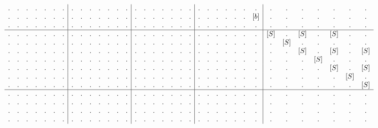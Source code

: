 \begin{example}
\begin{align}
\begin{array}{c c c c c c c | c c c c c c c | c c c c c c c | c c c c c c c | c c c c c c c}
. & . & . & . & . & . & .  &  . & . & . & . & . & . & .  &  . & . & . & . & . & . & .  &  . & . & .   & . & .   & . & .    &  . & . & . & . & . & . & .   \\
. & . & . & . & . & . & .  &  . & . & . & . & . & . & .  &  . & . & . & . & . & . & .  &  . & . & .   & . & .   & . & [b]  &  . & . & . & . & . & . & .   \\
. & . & . & . & . & . & .  &  . & . & . & . & . & . & .  &  . & . & . & . & . & . & .  &  . & . & .   & . & .   & . & .    &  . & . & . & . & . & . & .   \\
\hline
. & . & . & . & . & . & .  &  . & . & . & . & . & . & .  &  . & . & . & . & . & . & .  &  . & . & . & . & . & . & .  &  [S] & .   & [S] & .   & [S] & .   & .   \\
. & . & . & . & . & . & .  &  . & . & . & . & . & . & .  &  . & . & . & . & . & . & .  &  . & . & . & . & . & . & .  &  .   & [S] & .   & .   & .   & .   & .   \\
. & . & . & . & . & . & .  &  . & . & . & . & . & . & .  &  . & . & . & . & . & . & .  &  . & . & . & . & . & . & .  &  .   & .   & [S] & .   & [S] & .   & [S] \\
. & . & . & . & . & . & .  &  . & . & . & . & . & . & .  &  . & . & . & . & . & . & .  &  . & . & . & . & . & . & .  &  .   & .   & .   & [S] & .   & .   & .   \\
. & . & . & . & . & . & .  &  . & . & . & . & . & . & .  &  . & . & . & . & . & . & .  &  . & . & . & . & . & . & .  &  .   & .   & .   & .   & [S] & .   & [S] \\
. & . & . & . & . & . & .  &  . & . & . & . & . & . & .  &  . & . & . & . & . & . & .  &  . & . & . & . & . & . & .  &  .   & .   & .   & .   & .   & [S] & .   \\
. & . & . & . & . & . & .  &  . & . & . & . & . & . & .  &  . & . & . & . & . & . & .  &  . & . & . & . & . & . & .  &  .   & .   & .   & .   & .   & .   & [S] \\
\hline
. & . & . & . & . & . & .  &  . & . & . & . & . & . & .  &  . & . & . & . & . & . & .  &  . & . & . & . & . & . & .  &  . & . & . & . & . & . & .   \\
. & . & . & . & . & . & .  &  . & . & . & . & . & . & .  &  . & . & . & . & . & . & .  &  . & . & . & . & . & . & .  &  . & . & . & . & . & . & .   \\
. & . & . & . & . & . & .  &  . & . & . & . & . & . & .  &  . & . & . & . & . & . & .  &  . & . & . & . & . & . & .  &  . & . & . & . & . & . & .   \\
. & . & . & . & . & . & .  &  . & . & . & . & . & . & .  &  . & . & . & . & . & . & .  &  . & . & . & . & . & . & .  &  . & . & . & . & . & . & .   \\

\end{array}
\end{align}
\end{example}
